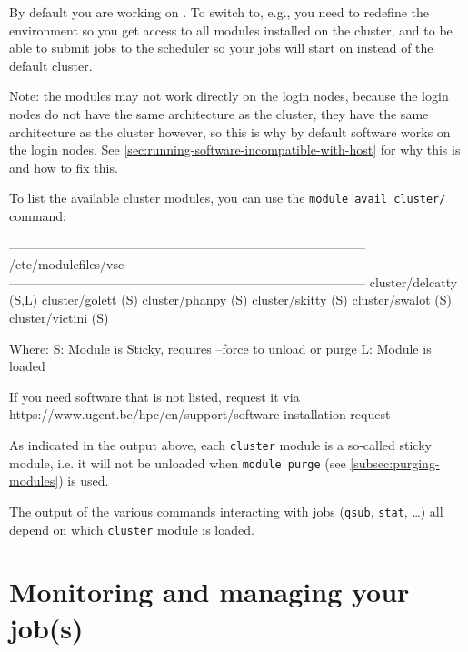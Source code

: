 By default you are working on . To switch to, e.g., \othercluster you need
to redefine the environment so you get access to all modules installed on
the \othercluster cluster, and to be able to submit jobs to the \othercluster scheduler
so your jobs will start on \othercluster instead of the default  cluster.

\begin{prompt}
\end{prompt}

Note: the \othercluster modules may not work directly on the login nodes, because the
login nodes do not have the same architecture as the \othercluster cluster, they
have the same architecture as the  cluster however, so this is why
by default software works on the login nodes. See \autoref{sec:running-software-incompatible-with-host}
for why this is and how to fix this.

To list the available cluster modules, you can use the \lstinline|module avail cluster/| command:
\begin{prompt}
------------------------------------------------------------------------------------ /etc/modulefiles/vsc ------------------------------------------------------------------------------------
   cluster/delcatty (S,L)    cluster/golett (S)    cluster/phanpy (S)    cluster/skitty (S)    cluster/swalot (S)    cluster/victini (S)

  Where:
   S:  Module is Sticky, requires --force to unload or purge
   L:  Module is loaded

If you need software that is not listed, request it via https://www.ugent.be/hpc/en/support/software-installation-request
\end{prompt}

As indicated in the output above, each \lstinline|cluster| module is a so-called sticky
module, i.e. it will not be unloaded when \lstinline|module purge| (see \autoref{subsec:purging-modules}) is used.

The output of the various commands interacting with jobs (\lstinline|qsub|, \lstinline|stat|, \ldots)
all depend on which \lstinline|cluster| module is loaded.
\fi


\section{Monitoring and managing your job(s)}
\label{sec:monitoring-and-managing-your-jobs}

